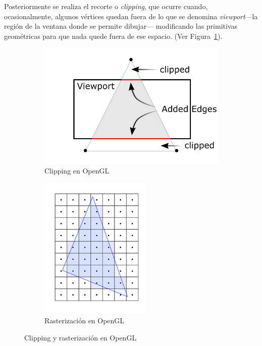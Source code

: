 Posteriormente se realiza el recorte o \textit{clipping}, que ocurre cuando,
ocasionalmente, algunos vértices quedan fuera de lo que se denomina
\textit{viewport}---la región de la ventana donde se permite dibujar---
modificando las primitivas geométricas para que nada quede fuera de ese espacio.
(Ver Figura~\ref{fig2.3a}).\\

\begin{figure}[h]
	\begin{subfigure}[b]{0.5\textwidth}
		\centering 
		\includegraphics{figures/clipping.png}
		\caption{Clipping en OpenGL}
		\label{fig2.3a}
	\end{subfigure}
	\begin{subfigure}[b]{0.5\textwidth}
		\centering 
		\includegraphics{figures/rasterization.png}
		\caption{Rasterización en OpenGL}
		\label{fig2.3b}
	\end{subfigure}
	\caption{Clipping y rasterización en OpenGL}
	\label{fig2.3}
\end{figure}

